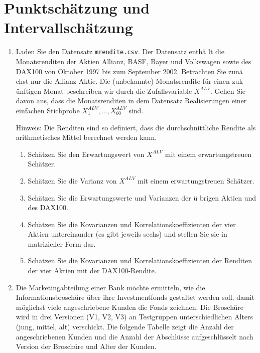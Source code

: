 \section[Schätzung]{Punktsch\"{a}tzung und Intervallsch\"{a}tzung}

\begin{enumerate}
\item Laden Sie den Datensatz \texttt{mrendite.csv}. Der Datensatz enth\"{a}%
lt die Monatsrenditen der Aktien Allianz, BASF, Bayer und Volkswagen sowie
des DAX100 von Oktober 1997 bis zum September 2002. Betrachten Sie zun\"{a}%
chst nur die Allianz-Aktie. Die (unbekannte) Monatsrendite f\"{u}r einen zuk%
\"{u}nftigen Monat beschreiben wir durch die Zufallsvariable $X^{ALV}.$
Gehen Sie davon aus, dass die Monatsrenditen in dem Datensatz Realisierungen
einer einfachen Stichprobe $X_{1}^{ALV},\ldots ,X_{60}^{ALV}$ sind.

Hinweis: Die Renditen sind so definiert, dass die durchschnittliche Rendite
als arithmetisches Mittel berechnet werden kann.

\begin{enumerate}
\item Sch\"{a}tzen Sie den Erwartungswert von $X^{ALV}$ mit einem
erwartungstreuen Sch\"{a}tzer.
\item Sch\"{a}tzen Sie die Varianz von $X^{ALV}$ mit einem erwartungstreuen
Sch\"{a}tzer.
\item Sch\"{a}tzen Sie die Erwartungswerte und Varianzen der \"{u}%
brigen Aktien und des DAX100.
\item Sch\"{a}tzen Sie die Kovarianzen und Korrelationskoeffizienten der
vier Aktien untereinander (es gibt jeweils sechs) und stellen Sie sie in
matrizieller Form dar.
\item Sch\"{a}tzen Sie die Kovarianzen und Korrelationskoeffizienten der
Renditen der vier Aktien mit der DAX100-Rendite.
\end{enumerate}

\item Die Marketingabteilung einer Bank m\"{o}chte ermitteln, wie die
Informationsbrosch\"{u}re \"{u}ber ihre Investmentfonds gestaltet werden
soll, damit m\"{o}glichst viele angeschriebene Kunden die Fonds zeichnen. 
Die Brosch\"{u}re wird in drei
Versionen (V1, V2, V3) an Testgruppen unterschiedlichen Alters (jung,
mittel, alt) verschickt. Die folgende Tabelle zeigt die Anzahl der
angeschriebenen Kunden und die Anzahl der Abschl\"{u}sse aufgeschl\"{u}sselt
nach Version der Brosch\"{u}re und Alter der Kunden.


\end{enumerate}
